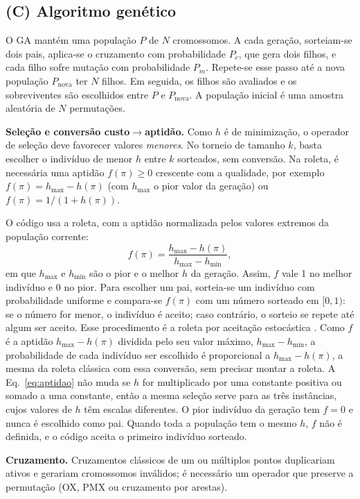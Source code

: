 \subsection{(C) Algoritmo genético}\label{sec:ga}

O GA mantém uma população $P$ de $N$ cromossomos. A cada geração, sorteiam-se dois pais, aplica-se o cruzamento com probabilidade $P_c$, que gera dois filhos, e cada filho sofre mutação com probabilidade $P_m$. Repete-se esse passo até a nova população $P_{\text{nova}}$ ter $N$ filhos. Em seguida, os filhos são avaliados e os sobreviventes são escolhidos entre $P$ e $P_{\text{nova}}$. A população inicial é uma amostra aleatória de $N$ permutações.

\textbf{Seleção e conversão custo$\to$aptidão.} Como $h$ é de minimização, o operador de seleção deve favorecer valores \textit{menores}. No torneio de tamanho $k$, basta escolher o indivíduo de menor $h$ entre $k$ sorteados, sem conversão. Na roleta, é necessária uma aptidão $f(\pi)\ge 0$ crescente com a qualidade, por exemplo $f(\pi)=h_{\max}-h(\pi)$ (com $h_{\max}$ o pior valor da geração) ou $f(\pi)=1/(1+h(\pi))$.

O código usa a roleta, com a aptidão normalizada pelos valores extremos da população corrente:
\begin{equation}
  f(\pi)=\frac{h_{\max}-h(\pi)}{h_{\max}-h_{\min}},
  \label{eq:aptidao}
\end{equation}
em que $h_{\max}$ e $h_{\min}$ são o pior e o melhor $h$ da geração. Assim, $f$ vale 1 no melhor indivíduo e 0 no pior. Para escolher um pai, sorteia-se um indivíduo com probabilidade uniforme e compara-se $f(\pi)$ com um número sorteado em $[0,1)$: se o número for menor, o indivíduo é aceito; caso contrário, o sorteio se repete até algum ser aceito. Esse procedimento é a roleta por aceitação estocástica \cite{lipowski2012}. Como $f$ é a aptidão $h_{\max}-h(\pi)$ dividida pelo seu valor máximo, $h_{\max}-h_{\min}$, a probabilidade de cada indivíduo ser escolhido é proporcional a $h_{\max}-h(\pi)$, a mesma da roleta clássica com essa conversão, sem precisar montar a roleta. A Eq.~\eqref{eq:aptidao} não muda se $h$ for multiplicado por uma constante positiva ou somado a uma constante, então a mesma seleção serve para as três instâncias, cujos valores de $h$ têm escalas diferentes. O pior indivíduo da geração tem $f=0$ e nunca é escolhido como pai. Quando toda a população tem o mesmo $h$, $f$ não é definida, e o código aceita o primeiro indivíduo sorteado.

\textbf{Cruzamento.} Cruzamentos clássicos de um ou múltiplos pontos duplicariam ativos e gerariam cromossomos inválidos; é necessário um operador que preserve a permutação (OX, PMX ou cruzamento por arestas).

